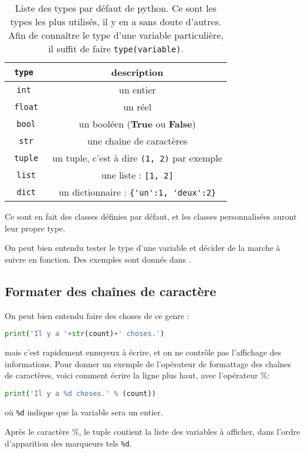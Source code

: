 \documentclass[a4paper,twoside]{article}
\begin{document}
\begin{table}[htb]
\centering
\begin{tabular}{|>{\tt}c<{}|c|}
\hline
type & description\\\hline
int & un entier\\\hline
float & un réel\\\hline
bool & un booléen (\textbf{True} ou \textbf{False})\\\hline
str & une chaîne de caractères\\\hline
tuple & un tuple, c'est à dire \verb|(1, 2)| par exemple\\\hline
list & une liste : \verb|[1, 2]|\\\hline
dict & un dictionnaire : \verb|{'un':1, 'deux':2}|\\\hline
\end{tabular}

\caption{Liste des types par défaut de python. Ce sont les types les plus utilisés, il y en a sans doute d'autres. Afin de connaître le type d'une variable particulière, il suffit de faire \texttt{type(variable)}.}\label{tab:types}
\end{table}

Ce sont en fait des classes définies par défaut, et les classes personnalisées auront leur propre type. 

\bigskip

On peut bien entendu tester le type d'une variable et décider de la marche à suivre en fonction. Des exemples sont donnés dans .

\subsection{Formater des chaînes de caractère}
On peut bien entendu faire des choses de ce genre : 
\begin{lstlisting}[language=python]
print('Il y a '+str(count)+' choses.')
\end{lstlisting}
mais c'est rapidement ennuyeux à écrire, et on ne contrôle pas l'affichage des informations. Pour donner un exemple de l'opérateur de formattage des chaînes de caractères, voici comment écrire la ligne plus haut, avec l'opérateur \og\%\fg :
\begin{lstlisting}[language=python]
print('Il y a %d choses.' % (count))
\end{lstlisting}
où \texttt{\%d} indique que la variable sera un entier.

\begin{remarque}
Après le caractère \og\%\fg, le tuple contient la liste des variables à afficher, dans l'ordre d'apparition des marqueurs tels \texttt{\%d}.
\end{remarque}
\end{document}
